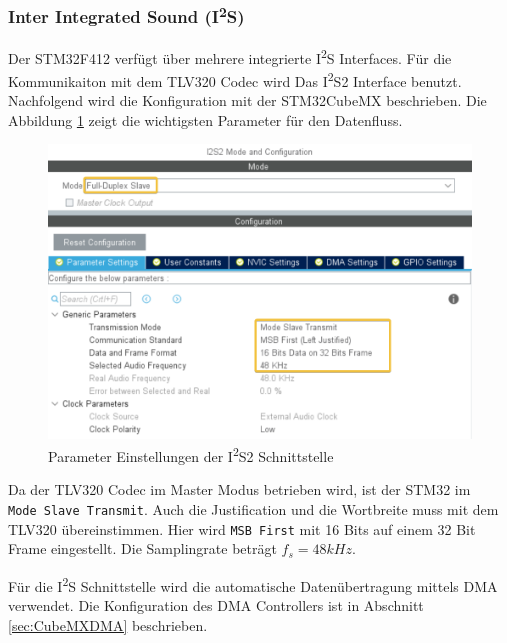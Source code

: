 \subsubsection{Inter Integrated Sound (I\textsuperscript{2}S)}
\label{sec:CubeMXI2S}

Der STM32F412 verfügt über mehrere integrierte I\textsuperscript{2}S Interfaces. 
Für die Kommunikaiton mit dem TLV320 Codec wird Das I\textsuperscript{2}S2 Interface benutzt.
Nachfolgend wird die Konfiguration mit der STM32CubeMX beschrieben.
Die Abbildung \ref{pic:CubeMX_I2S} zeigt die wichtigsten Parameter für den Datenfluss.

\begin{figure}[H]
	\centering
	\includegraphics[width=0.9\linewidth]{../graphics/CubeMX_I2S.png}
	\caption{Parameter Einstellungen der I\textsuperscript{2}S2 Schnittstelle}
	\label{pic:CubeMX_I2S}
\end{figure}

Da der TLV320 Codec im Master Modus betrieben wird, ist der STM32 im \\
\texttt{Mode Slave Transmit}.
Auch die Justification und die Wortbreite muss mit dem TLV320 übereinstimmen. Hier wird \texttt{MSB First} mit 16 Bits auf einem 32 Bit Frame eingestellt.
Die Samplingrate beträgt $f_s = 48\si{kHz}$.

Für die I\textsuperscript{2}S Schnittstelle wird die automatische Datenübertragung mittels DMA verwendet. Die Konfiguration des DMA Controllers ist in Abschnitt \ref{sec:CubeMXDMA} beschrieben.

